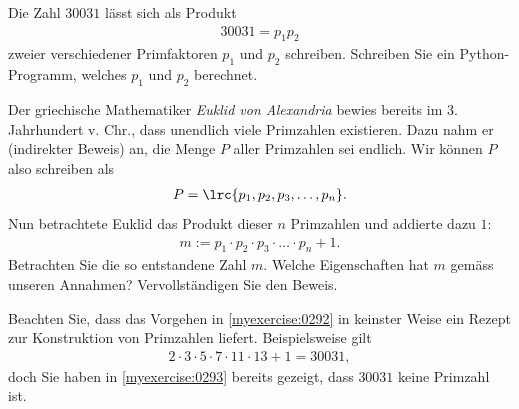 \begin{myexercise}\label{myexercise:0293}
	Die Zahl $30031$ lässt sich als Produkt
	\begin{align*}
		30031 = p_1p_2
	\end{align*}
	zweier verschiedener Primfaktoren $p_1$ und $p_2$ schreiben. Schreiben Sie ein Python-Programm, welches $p_1$ und $p_2$ berechnet.
\end{myexercise}

\begin{myexercise}\label{myexercise:0292}
	Der griechische Mathematiker \textit{Euklid von Alexandria} bewies bereits im 3. Jahrhundert v. Chr., dass unendlich viele Primzahlen existieren. Dazu nahm er (indirekter Beweis) an, die Menge $P$ aller Primzahlen sei endlich. Wir können $P$ also schreiben als
	\begin{align*}
		P = \lrc{p_1, p_2, p_3, \ldots , p_n}.
	\end{align*}
	Nun betrachtete Euklid das Produkt dieser $n$ Primzahlen und addierte dazu $1$:
	\begin{align*}
		m := p_1\cdot p_2\cdot p_3\cdot \ldots \cdot p_n + 1.
	\end{align*}
	Betrachten Sie die so entstandene Zahl $m$. Welche Eigenschaften hat $m$ gemäss unseren Annahmen? Vervollständigen Sie den Beweis.
\end{myexercise}

\begin{myremark}
	Beachten Sie, dass das Vorgehen in \cref{myexercise:0292} in keinster Weise ein Rezept zur Konstruktion von Primzahlen liefert. Beispielsweise gilt
	\begin{align*}
		2\cdot 3\cdot 5\cdot 7\cdot 11\cdot 13 + 1 = 30031,
	\end{align*}
	doch Sie haben in \cref{myexercise:0293} bereits gezeigt, dass $30031$ keine Primzahl ist.
\end{myremark}

\clearpage
